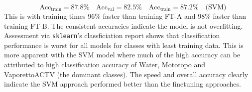 \documentclass[11pt,a4paper]{article}
\begin{document}
\begin{equation*}
    \quad\text{Acc}_\text{train} = 87.8\% \quad \text{Acc}_\text{val} = 82.5\% \quad \text{Acc}_\text{train} = 87.2\% \quad \text{(SVM)}
\end{equation*}
This is with training times 96\% faster than training FT-A and 98\% faster than training FT-B.
The consistent accuracies indicate the model is not overfitting. Assessment via \texttt{sklearn}'s classficiation report shows that classification performance is worst for all models for classes with least training data. This is more apparent with the SVM model where much of the high accuracy can be attributed to high classification accuracy of Water, Mototopo and VaporettoACTV (the dominant classes). The speed and overall accuracy clearly indicate the SVM approach performed better than the finetuning approaches.
\end{document}
